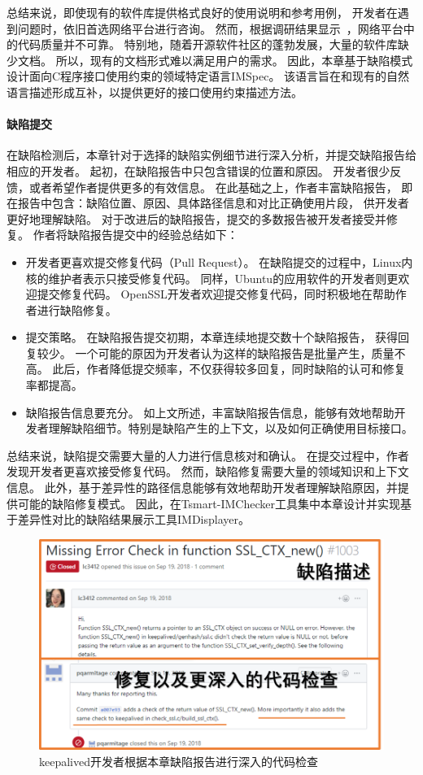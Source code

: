 总结来说，即使现有的软件库提供格式良好的使用说明和参考用例，
开发者在遇到问题时，依旧首选网络平台进行咨询。
然而，根据调研结果显示~\cite{18-icse-stack}，网络平台中的代码质量并不可靠。
特别地，随着开源软件社区的蓬勃发展，大量的软件库缺少文档。
所以，现有的文档形式难以满足用户的需求。
因此，本章基于缺陷模式设计面向C程序接口使用约束的领域特定语言IMSpec。
该语言旨在和现有的自然语言描述形成互补，以提供更好的接口使用约束描述方法。



\paragraph{缺陷提交}
在缺陷检测后，本章针对于选择的缺陷实例细节进行深入分析，并提交缺陷报告给相应的开发者。
起初，在缺陷报告中只包含错误的位置和原因。
开发者很少反馈，或者希望作者提供更多的有效信息。
在此基础之上，作者丰富缺陷报告，
即在报告中包含：缺陷位置、原因、具体路径信息和对比正确使用片段，
供开发者更好地理解缺陷。
对于改进后的缺陷报告，提交的多数报告被开发者接受并修复。
作者将缺陷报告提交中的经验总结如下：
\begin{itemize}
	\item 开发者更喜欢提交修复代码（Pull Request）。
	在缺陷提交的过程中，Linux内核的维护者表示只接受修复代码。
	同样，Ubuntu的应用软件的开发者则更欢迎提交修复代码。
	OpenSSL开发者欢迎提交修复代码，同时积极地在帮助作者进行缺陷修复。
	\item 提交策略。
	在缺陷报告提交初期，本章连续地提交数十个缺陷报告，
	获得回复较少。
	一个可能的原因为开发者认为这样的缺陷报告是批量产生，质量不高。
	此后，作者降低提交频率，不仅获得较多回复，同时缺陷的认可和修复率都提高。
	\item 缺陷报告信息要充分。
	如上文所述，丰富缺陷报告信息，能够有效地帮助开发者理解缺陷细节。特别是缺陷产生的上下文，以及如何正确使用目标接口。
\end{itemize}

总结来说，缺陷提交需要大量的人力进行信息核对和确认。
在提交过程中，作者发现开发者更喜欢接受修复代码。
然而，缺陷修复需要大量的领域知识和上下文信息。
此外，基于差异性的路径信息能够有效地帮助开发者理解缺陷原因，并提供可能的缺陷修复模式。
因此，在Tsmart-IMChecker工具集中本章设计并实现基于差异性对比的缺陷结果展示工具IMDisplayer。

\begin{figure}[b]
	\centering
	\includegraphics[width=0.8\linewidth]{figures/cp4-keepalived-fix.png}
	\caption{
		keepalived开发者根据本章缺陷报告进行深入的代码检查
	}
	\label{fig:4-4-keepalived-fix}
\end{figure}

